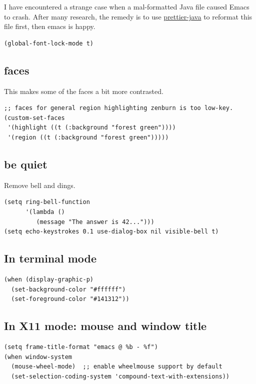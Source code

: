 \documentclass[11pt]{article}
\begin{document}
I have encountered a strange case when a mal-formatted Java file
caused Emacs to crash. After many research, the remedy is to use
\href{https://github.com/jhipster/prettier-java}{prettier-java} to reformat this file first, then emacs is happy.

\begin{verbatim}
(global-font-lock-mode t)
\end{verbatim}

\subsection{faces}
\label{sec:org007a619}

This makes some of the faces a bit more contrasted.

\begin{verbatim}
;; faces for general region highlighting zenburn is too low-key.
(custom-set-faces
 '(highlight ((t (:background "forest green"))))
 '(region ((t (:background "forest green")))))
\end{verbatim}


\subsection{be quiet}
\label{sec:orgd7113e0}
Remove bell and dings.

\begin{verbatim}
(setq ring-bell-function
      '(lambda ()
         (message "The answer is 42...")))
(setq echo-keystrokes 0.1 use-dialog-box nil visible-bell t)
\end{verbatim}
\subsection{In terminal mode}
\label{sec:org5046155}
\begin{verbatim}
(when (display-graphic-p)
  (set-background-color "#ffffff")
  (set-foreground-color "#141312"))
\end{verbatim}
\subsection{In X11 mode: mouse and window title}
\label{sec:orgf4a34b9}
\begin{verbatim}
(setq frame-title-format "emacs @ %b - %f")
(when window-system
  (mouse-wheel-mode)  ;; enable wheelmouse support by default
  (set-selection-coding-system 'compound-text-with-extensions))
\end{verbatim}
\end{document}
